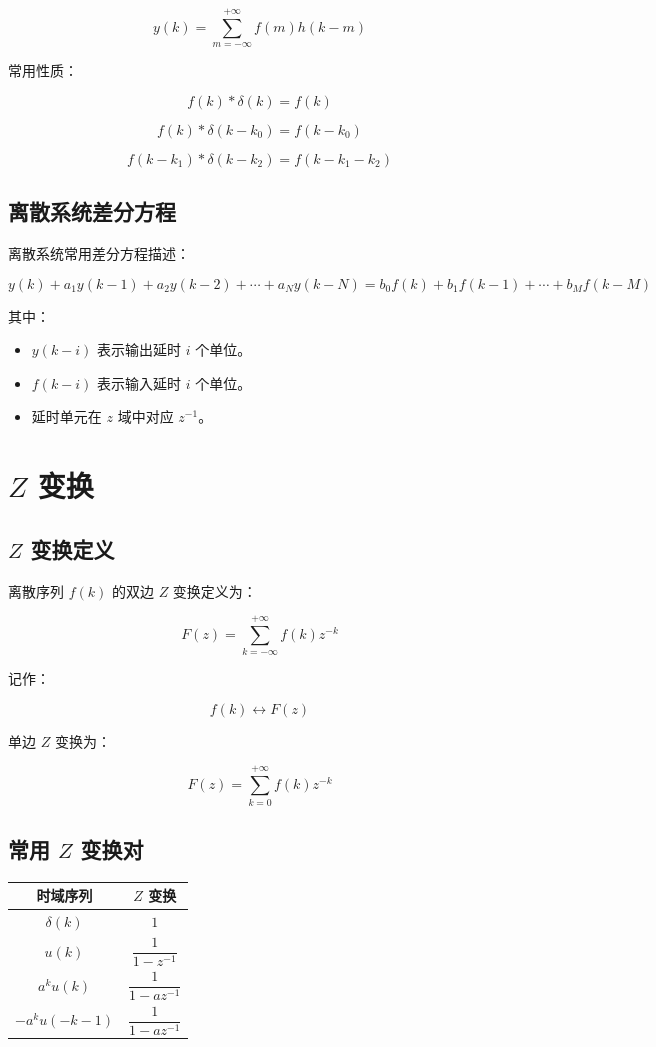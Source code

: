 \documentclass[UTF8]{ctexart}
\begin{document}
\[
y(k)=\sum_{m=-\infty}^{+\infty}f(m)h(k-m)
\]

常用性质：

\[
f(k)*\delta(k)=f(k)
\]

\[
f(k)*\delta(k-k_0)=f(k-k_0)
\]

\[
f(k-k_1)*\delta(k-k_2)=f(k-k_1-k_2)
\]

\subsection{离散系统差分方程}

离散系统常用差分方程描述：

\[
y(k)+a_1y(k-1)+a_2y(k-2)+\cdots+a_Ny(k-N)
=
b_0f(k)+b_1f(k-1)+\cdots+b_Mf(k-M)
\]

其中：

\begin{itemize}
    \item $y(k-i)$ 表示输出延时 $i$ 个单位。
    \item $f(k-i)$ 表示输入延时 $i$ 个单位。
    \item 延时单元在 $z$ 域中对应 $z^{-1}$。
\end{itemize}

\section{$Z$ 变换}

\subsection{$Z$ 变换定义}

离散序列 $f(k)$ 的双边 $Z$ 变换定义为：

\[
F(z)=\sum_{k=-\infty}^{+\infty}f(k)z^{-k}
\]

记作：

\[
f(k)\leftrightarrow F(z)
\]

单边 $Z$ 变换为：

\[
F(z)=\sum_{k=0}^{+\infty}f(k)z^{-k}
\]

\subsection{常用 $Z$ 变换对}

\begin{table}[h]
\centering
\begin{tabular}{c c}
\toprule
时域序列 & $Z$ 变换 \\
\midrule
$\delta(k)$ & $1$ \\
$u(k)$ & $\dfrac{1}{1-z^{-1}}$ \\
$a^ku(k)$ & $\dfrac{1}{1-az^{-1}}$ \\
$-a^ku(-k-1)$ & $\dfrac{1}{1-az^{-1}}$ \\
\bottomrule
\end{tabular}
\end{table}
\end{document}
